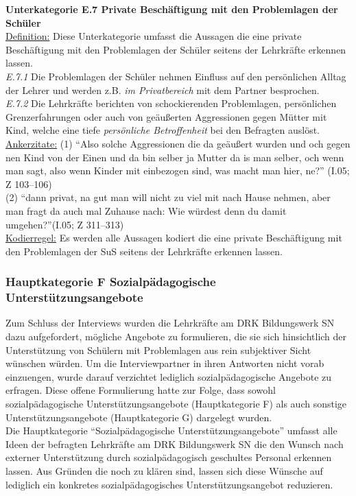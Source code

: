 \textbf{Unterkategorie E.7 Private Beschäftigung mit den Problemlagen der Schüler}\\
\underline{Definition:} Diese Unterkategorie umfasst die Aussagen die eine private Beschäftigung mit den Problemlagen der Schüler seitens der Lehrkräfte erkennen lassen.\\
\textit{E.7.1} Die Problemlagen der Schüler nehmen Einfluss auf den persönlichen Alltag der Lehrer und werden z.B. \textit{im Privatbereich} mit dem Partner besprochen.\\
\textit{E.7.2} Die Lehrkräfte berichten von schockierenden Problemlagen, persönlichen Grenzerfahrungen oder auch von geäußerten Aggressionen gegen Mütter mit Kind, welche eine tiefe \textit{persönliche Betroffenheit} bei den Befragten auslöst.\\
\underline{Ankerzitate:} (1) "`Also solche Aggressionen die da geäußert wurden und och gegen nen Kind von der Einen und da bin selber ja Mutter da is man selber, och wenn man sagt, also wenn Kinder mit einbezogen sind, was macht man hier, ne?"' (I.05; Z 103--106)\\ (2) "`dann privat, na gut man will nicht zu viel mit nach Hause nehmen, aber man fragt da auch mal Zuhause nach: Wie würdest denn du damit umgehen?"'(I.05; Z 311--313)\\
\underline{Kodierregel:} Es werden alle Aussagen kodiert die eine private Beschäftigung mit den Problemlagen der SuS seitens der Lehrkräfte erkennen lassen.\\

\subsubsection{Hauptkategorie F Sozialpädagogische Unterstützungsangebote}
\label{sec:HauptkategorieFSozialpädagogischeUnterstützungsangebote}

Zum Schluss der Interviews wurden die Lehrkräfte am DRK Bildungswerk SN dazu aufgefordert, mögliche Angebote zu formulieren, die sie sich hinsichtlich der Unterstützung von Schülern mit Problemlagen aus rein subjektiver Sicht wünschen würden. Um die Interviewpartner in ihren Antworten nicht vorab einzuengen, wurde darauf verzichtet lediglich sozialpädagogische Angebote zu erfragen. Diese offene Formulierung hatte zur Folge, dass sowohl sozialpädagogische Unterstützungsangebote (Hauptkategorie F) als auch sonstige Unterstützungsangebote (Hauptkategorie G) dargelegt wurden.\\
Die Hauptkategorie "`Sozialpädagogische Unterstützungsangebote"' umfasst alle Ideen der befragten Lehrkräfte am DRK Bildungswerk SN die den Wunsch nach externer Unterstützung durch sozialpädagogisch geschultes Personal erkennen lassen. Aus Gründen die noch zu klären sind, lassen sich diese Wünsche auf lediglich ein konkretes sozialpädagogisches Unterstützungsangebot reduzieren.\\

